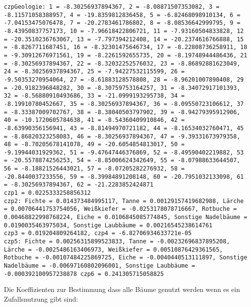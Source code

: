 \documentclass[twocolumn]{scrartcl}
\begin{document}
\texttt{czpGeologie: 1 = -8.30256937894367, 2 = -8.08871507353082, 3 = -8.11571058388957, 4 = -19.8359812836458, 5 = -6.82468098910134, 6 = -7.04153475076478, 7 = -20.2783461786802, 8 = -8.08536642999795, 9 = -8.43950837757173, 10 = -7.96618422806721, 11 = -7.93160504833828, 12 = -20.3510236763067, 13 = -7.797394212408, 14 = -20.2374616766888, 15 = -8.8267711687451, 16 = -8.32301475646734, 17 = -8.22808736258911, 18 = -9.30912676971561, 19 = -8.2261592655735, 20 = -8.19748944486436, 21 = -8.30256937894367, 22 = -8.32032252576032, 23 = -8.86892881623049, 24 = -8.30256937894367, 25 = -7.94227532115599, 26 = -9.50353270954064, 27 = -8.61883128578808, 28 = -8.96201007890408, 29 = -20.9182396848282, 30 = -8.30759753164257, 31 = -8.34072917101393, 32 = -8.56880910493686, 33 = -21.0999193295738, 34 = -8.19910780452667, 35 = -8.30256937894367, 36 = -8.09550723106612, 37 = -8.33387009702767, 38 = -8.38040503797902, 39 = -8.94279395912906, 40 = -10.1720605784638, 41 = -8.54360409910846, 42 = -8.63990356156941, 43 = -8.81494970721182, 44 = -8.16534032760471, 45 = -8.86820323258083, 46 = -8.30256937894367, 47 = -9.39331673979358, 48 = -8.70205678141078, 49 = -20.6054854813017, 50 = -9.19944031929362, 51 = -9.47647446376869, 52 = -8.49590402219882, 53 = -20.5578874256253, 54 = -8.85006624342649, 55 = -8.07988633644507, 56 = -8.18821526443021, 57 = -8.07205282276932, 58 = -20.8440037233556, 59 = -8.39984891208148, 60 = -20.7951032133098, 61 = -8.30256937894367, 62 = -21.2283852424871\\
  czp1 = 0.0225333258856312\\
  czp2: Fichte = 0.014373484995117, Tanne = 0.00129157419682988,
  Lärche = 0.00706441753754056, Weißkiefer = -0.0253178078716667,
  Rotbuche = 0.00468822998768224, Eiche = 0.0106845085774845, Sonstige
  Nadelbäume = 0.0190035463975034, Sonstige Laubbäume =
  0.00216545238614761\\
  czp3 = 0.019204809264182, czp4 = -6.82706934633721e-05\\
  czp5: Fichte = 0.00256315899523833, Tanne = -0.00232696837895208,
  Lärche = -0.0025486163406973, Weißkiefer = 0.00510876429361565,
  Rotbuche = -0.00107484225869725, Eiche = -0.0040440513111897,
  Sonstige Nadelbäume = -0.00697160802096001, Sonstige Laubbäume =
  -0.000392100957238878 czp6 = 0.241305715058825 }

Die Koeffizienten zur Bestimmung dass alle Bäume genutzt werden wenn
es ein Zufallsnutzung gibt sind:
\end{document}
